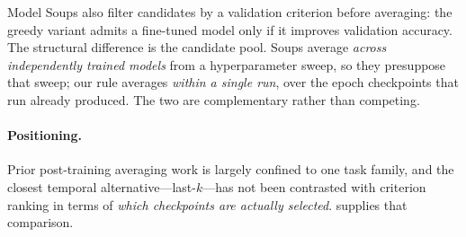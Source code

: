 Model Soups \cite{wortsman2022model} also filter candidates by a validation
criterion before averaging: the greedy variant admits a fine-tuned model only
if it improves validation accuracy. The structural difference is the candidate
pool. Soups average \emph{across independently trained models} from a
hyperparameter sweep, so they presuppose that sweep; our rule averages
\emph{within a single run}, over the epoch checkpoints that run already
produced. The two are complementary rather than competing.

\paragraph{Positioning.}
Prior post-training averaging work is largely confined to one task family, and
the closest temporal alternative---last-$k$---has not been contrasted with
criterion ranking in terms of \emph{which checkpoints are actually selected}.
 supplies that comparison.
